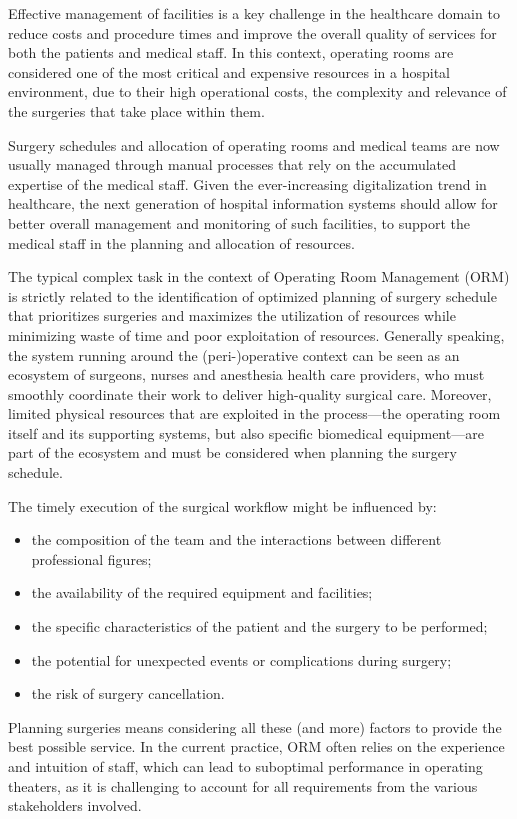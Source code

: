 Effective management of facilities is a key challenge in the healthcare domain
 to reduce costs and procedure times and improve the overall quality of services for both the patients and medical staff. 
%
In this context, operating rooms are considered one of the most critical and expensive resources in a hospital environment, due to their high operational costs, the complexity and relevance of the surgeries that take place within them.

Surgery schedules and allocation of operating rooms and medical teams are now usually managed through manual processes that rely on the accumulated expertise of the medical staff. 
% 
Given the ever-increasing digitalization trend in healthcare, the next generation of hospital information systems should allow for better overall management and monitoring of such facilities, to support the medical staff in the planning and allocation of resources.


The typical complex task in the context of Operating Room Management (ORM) is strictly related to the identification of optimized planning of surgery schedule that prioritizes surgeries and maximizes the utilization of resources while minimizing waste of time and poor exploitation of resources.
%
Generally speaking, the system running around the (peri-)operative context can be seen as an ecosystem of surgeons, nurses and anesthesia health care providers, who must smoothly coordinate their work to deliver high-quality surgical care.
%
Moreover, limited physical resources that are exploited in the process---the operating room itself and its supporting systems, but also specific biomedical equipment---are part of the ecosystem and must be considered when planning the surgery schedule.

The timely execution of the surgical workflow might be influenced by:
\begin{itemize}
\item the composition of the team and the interactions between different professional figures;
\item the availability of the required equipment and facilities;
\item the specific characteristics of the patient and the surgery to be performed;
\item the potential for unexpected events or complications during surgery;
\item the risk of surgery cancellation.
\end{itemize}
%
Planning surgeries means considering all these (and more) factors to provide the best possible service.
%
In the current practice, ORM often relies on the experience and intuition of staff, which can lead to suboptimal performance in operating theaters, as it is challenging to account for all requirements from the various stakeholders involved.

